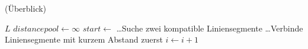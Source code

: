 \begin{algorithm}[!ht]
\caption{ (Überblick)}
\label{alg:mergelines1}
\begin{algorithmic}[1]
	\Require $L$
	\State $\mathit{distancepool} \gets \infty$
		\State {}
		\State $\mathit{start} \gets$ 
		\State \ldots \Comment Suche zwei kompatible Liniensegmente
			\State {}
		\EndIf
		\State \ldots \Comment Verbinde Liniensegmente mit kurzem Abstand zuerst
		\State $i \gets i + 1$
	\EndFor
\end{algorithmic}
\end{algorithm}
